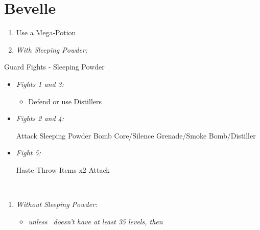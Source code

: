 \chapter{Bevelle}\label{ch:bevelle}

\begin{enumerate}
	\item Use a Mega-Potion
	\item \textit{With Sleeping Powder:}
\end{enumerate}
\begin{battle}{Guard Fights - Sleeping Powder}
	\begin{itemize}
		\item \textit{Fights 1 and 3:}
		      \begin{itemize}
			      \tidusf Attack
			      \item Defend or use Distillers
		      \end{itemize}
		\item \textit{Fights 2 and 4:}
		      \begin{itemize}
			      \tidusf Attack
			      \rikkuf Sleeping Powder
			      \kimahrif Bomb Core/Silence Grenade/Smoke Bomb/Distiller
		      \end{itemize}
		\item \textit{Fight 5:}
		      \begin{itemize}
			      \tidusf Haste \rikku
			      \rikkuf Throw Items x2
			      \tidusf Attack
		      \end{itemize}
	\end{itemize}
\end{battle}
\bothvfill
\lossvfill
\winvfill
\ 
\bothcb
\wincb
\losscb
\ 
\ \bothnewline \winnewline \lossnewline
\begin{enumerate}[resume]
	\item \textit{Without Sleeping Powder:}
	      \begin{itemize}
		      \item \formation{\tidus}{\rikku}{\auron} \textit{unless \lulu\ doesn't have at least 35 levels, then } \formation{\tidus}{\rikku}{\lulu}
	      \end{itemize}
\end{enumerate}
